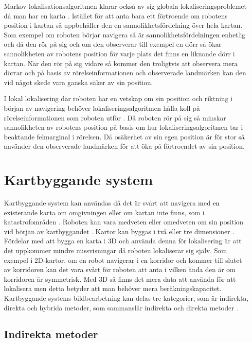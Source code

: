 Markov lokalisationsalgoritmen klarar också av sig globala lokaliseringsproblemet då man har en karta \citep{ProbabilisticRobotics}. Istället för att anta bara ett förtroende om robotens position i kartan så uppbehåller den en sannolikhetsfördelning över hela kartan. Som exempel om roboten börjar navigera så är sannolikhetsfördelningen enhetlig och då den rör på sig och om den observerar till exempel en dörr så ökar sannolikheten av robotens position för varje plats det finns en liknande dörr i kartan. När den rör på sig vidare så kommer den troligtvis att observera mera dörrar och på basis av rörelseinformationen och observerade landmärken kan den vid något skede vara ganska säker av sin position.

I lokal lokalisering där roboten har en vetskap om sin position och riktning i början av navigering behöver lokaliseringsalgoritmen hålla koll på rörelseinformationen som roboten utför \citep{montecarlo,ProbabilisticRobotics}. Då roboten rör på sig så minskar sannolikheten av robotens position på basis om hur lokaliseringsalgoritmen tar i beaktande felmarginal i rörelsen. Då osäkerhet av sin egen position är för stor så använder den observerade landmärken för att öka på förtroendet av sin position. 

\section{Kartbyggande system}

Kartbyggande system kan användas då det är svårt att navigera med en existerande karta om omgivningen eller om kartan inte finns, som i katastrofområden \citep{geospatial}. Roboten kan vara medveten eller omedveten om sin position vid början av kartbyggandet \citep{globalsubmaps}. Kartor kan byggas i två eller tre dimensioner \citep{ProbabilisticRobotics}. Fördelar med att bygga en karta i 3D och använda denna för lokalisering är att det uppkommer mindre missvisningar då roboten lokaliserar sig själv. Som exempel i 2D-kartor, om en robot navigerar i en korridor och kommer till slutet av korridoren kan det vara svårt för roboten att anta i vilken ända den är om korridoren är symmetrisk. Med 3D så finns det mera data att använda för att lokalisera men detta betyder att man behöver mera beräkningskapacitet. Kartbyggande systems bildbearbetning kan delas tre kategorier, som är indirekta, direkta och hybrida metoder, som sammanslår indirekta och direkta metoder \citep{geospatial}.

\subsection{Indirekta metoder}

